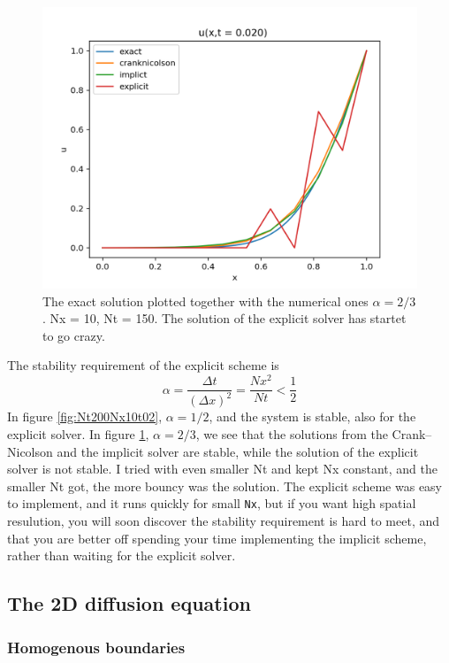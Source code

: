 \documentclass{article}
\begin{document}
\begin{figure}
  \includegraphics[width=\linewidth]{Nt150Nx10t02.png}
  \caption{The exact solution plotted together with the numerical ones $\alpha = 2/3$. Nx = 10, Nt = 150. The solution of the explicit solver has startet to go crazy.}
  \label{fig:Nt150Nx10t02}
\end{figure} 
The stability requirement of the explicit scheme is
$$\alpha =\frac{\Delta t}{(\Delta x)^2}= \frac{Nx^2}{Nt} <\frac{1}{2}$$
In figure \ref{fig:Nt200Nx10t02}, $\alpha = 1/2$, and the system is stable, also for the explicit solver. In figure \ref{fig:Nt150Nx10t02}, $\alpha = 2/3$, we see that the solutions from the Crank--Nicolson and the implicit solver are stable, while the solution of the explicit solver is not stable. I tried with even smaller Nt and kept Nx constant, and the smaller Nt got, the more bouncy was the solution. The explicit scheme was easy to implement, and it runs quickly for small \texttt{Nx}, but if you want high spatial resulution, you will soon discover the stability requirement is hard to meet, and that you are better off spending your time implementing the implicit scheme, rather than waiting for the explicit solver.
\subsection{The 2D diffusion equation}
\subsubsection{Homogenous boundaries}
\end{document}
